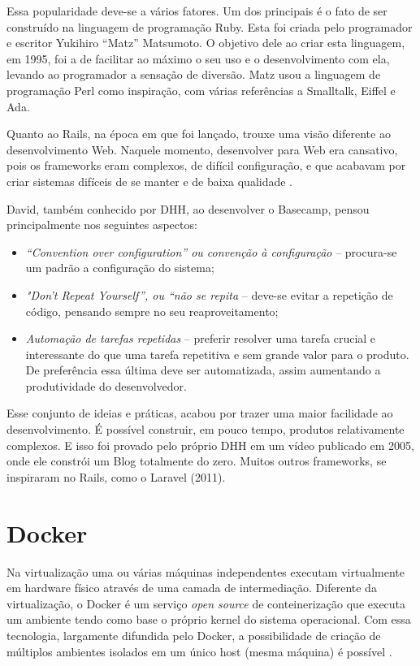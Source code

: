 Essa popularidade deve-se a vários fatores. Um dos principais é o fato de ser construído na linguagem de programação Ruby. Esta foi criada pelo programador e escritor Yukihiro “Matz” Matsumoto. O objetivo dele ao criar esta linguagem, em 1995, foi a de facilitar ao máximo o seu uso e o desenvolvimento com ela, levando ao programador a sensação de diversão. Matz usou a linguagem de programação Perl como inspiração, com várias referências a Smalltalk, Eiffel e Ada.

Quanto ao Rails, na época em que foi lançado, trouxe uma visão diferente ao desenvolvimento Web. Naquele momento, desenvolver para Web era cansativo, pois os frameworks eram complexos, de difícil configuração, e que acabavam por criar sistemas difíceis de se manter e de baixa qualidade .

David, também conhecido por DHH, ao desenvolver o Basecamp, pensou principalmente nos seguintes aspectos:

\begin{itemize}
   \item \textit{“Convention over configuration” ou convenção à configuração} -- procura-se um padrão a configuração do sistema;
   \item \textit{"Don’t Repeat Yourself”, ou “não se repita} -- deve-se evitar a repetição de código, pensando sempre no seu reaproveitamento;
   \item \textit{Automação de tarefas repetidas} -- preferir resolver uma tarefa crucial e interessante do que uma tarefa repetitiva e sem grande valor para o produto. De preferência essa última deve ser automatizada, assim aumentando a produtividade do desenvolvedor.
\end{itemize}

Esse conjunto de ideias e práticas, acabou por trazer uma maior facilidade ao desenvolvimento. É possível construir, em pouco tempo, produtos relativamente complexos. E isso foi provado pelo próprio DHH em um vídeo publicado em 2005, onde ele constrói um Blog totalmente do zero. Muitos outros frameworks, se inspiraram no Rails, como o Laravel (2011).

\section{Docker}

Na virtualização uma ou várias máquinas independentes executam virtualmente em hardware físico através de uma camada de intermediação. Diferente da virtualização, o Docker é um serviço \textit{open source} de conteinerização que executa um ambiente tendo como base o próprio kernel do sistema operacional. Com essa tecnologia, largamente difundida pelo Docker, a possibilidade de criação de múltiplos ambientes isolados em um único host (mesma máquina) é possível .

